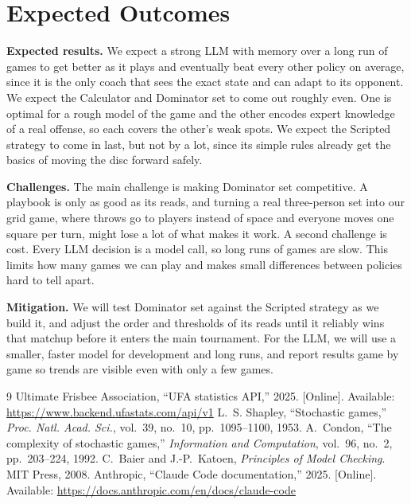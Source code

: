 \documentclass[conference]{IEEEtran}
\begin{document}
\section{Expected Outcomes}
\textbf{Expected results.} We expect a strong LLM with memory over a long run of games to get better as it plays and eventually beat every other policy on average, since it is the only coach that sees the exact state and can adapt to its opponent. We expect the Calculator and Dominator set to come out roughly even. One is optimal for a rough model of the game and the other encodes expert knowledge of a real offense, so each covers the other's weak spots. We expect the Scripted strategy to come in last, but not by a lot, since its simple rules already get the basics of moving the disc forward safely.

\textbf{Challenges.} The main challenge is making Dominator set competitive. A playbook is only as good as its reads, and turning a real three-person set into our grid game, where throws go to players instead of space and everyone moves one square per turn, might lose a lot of what makes it work. A second challenge is cost. Every LLM decision is a model call, so long runs of games are slow. This limits how many games we can play and makes small differences between policies hard to tell apart.

\textbf{Mitigation.} We will test Dominator set against the Scripted strategy as we build it, and adjust the order and thresholds of its reads until it reliably wins that matchup before it enters the main tournament. For the LLM, we will use a smaller, faster model for development and long runs, and report results game by game so trends are visible even with only a few games.

\begin{thebibliography}{9}
 Ultimate Frisbee Association, ``UFA statistics API,'' 2025. [Online]. Available: \url{https://www.backend.ufastats.com/api/v1}
 L.~S. Shapley, ``Stochastic games,'' \emph{Proc. Natl. Acad. Sci.}, vol.~39, no.~10, pp.~1095--1100, 1953.
 A.~Condon, ``The complexity of stochastic games,'' \emph{Information and Computation}, vol.~96, no.~2, pp.~203--224, 1992.
 C.~Baier and J.-P.~Katoen, \emph{Principles of Model Checking}. MIT Press, 2008.
 Anthropic, ``Claude Code documentation,'' 2025. [Online]. Available: \url{https://docs.anthropic.com/en/docs/claude-code}
\end{thebibliography}
\end{document}
